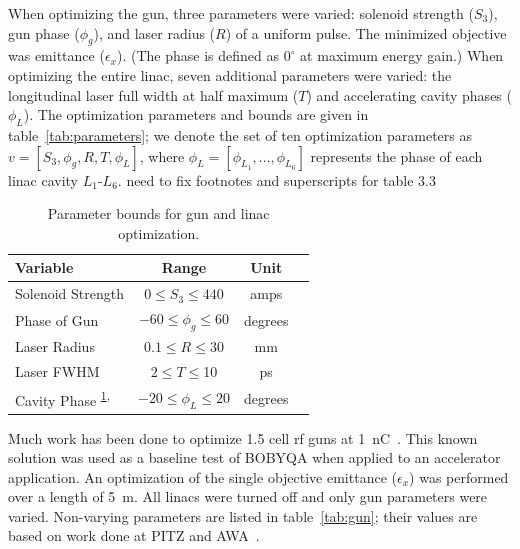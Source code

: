 \documentclass{iitthesis}
\newcommand{\nrnote}[1]{\textsf{{\color{blue}{ NN note:}   #1 }}}
\begin{document}
When optimizing the gun, three parameters were varied: 
solenoid strength ($S_3$), gun phase ($\phi_g$), 
and laser radius ($R$) of a uniform pulse. 
The minimized objective was emittance ($\epsilon_x$).
(The phase is defined as $0^{\circ}$ at maximum energy gain.) 
When optimizing the entire linac, seven additional parameters were 
varied: the longitudinal laser full width at half maximum ($T$)
and accelerating cavity phases ($\phi_L$). The optimization parameters and
bounds are given in table~\ref{tab:parameters}; we denote the set of
ten optimization parameters as $v=[S_3, \phi_g, R, T, \phi_L]$, where 
$\phi_L=[\phi_{L_1},\ldots,\phi_{L_6}]$ represents the phase of each linac cavity $L_1$-$L_6$. 
\nrnote{need to fix footnotes and superscripts for table 3.3}
\begin{table}
	\caption{\label{tab:parameters} Parameter bounds for gun and linac optimization.}
	\begin{center}
		\begin{tabular}{ l *{3}{c}} 
			\toprule
			\textbf{Variable} & \textbf{Range} & \textbf{Unit} \\
			\midrule
			Solenoid Strength & $ 0 \le S_3 \le 440$  & amps \\
			Phase of Gun & $-60 \le \phi_g \le 60$  & degrees \\
			Laser Radius  & $0.1 \le R \le 30$  & mm \\
			Laser FWHM \footnotemark \label{note1}& $2 \le T \le $10  & ps \\
			Cavity Phase \textsuperscript{\ref{note1},}\footnotemark & $-20 \le \phi_L \le 20$  & degrees \\
			\bottomrule	
		\end{tabular}
	\addtocounter{footnote}{-1}
	\addtocounter{footnote}{+1}
	\end{center}
\end{table}


 \label{sec:gunbobyqa}
Much work has been done to optimize 1.5 cell rf guns
at \SI{1}{nC}~\cite{pitz}. This known solution was used as 
a baseline test of BOBYQA when applied to an accelerator application.
An optimization of the single objective emittance ($\epsilon_x$) was 
performed over a length of \SI{5}{m}. 
All linacs were turned off and only gun parameters were varied. 
Non-varying parameters are listed in table~\ref{tab:gun}; 
their values are based on work done at PITZ and AWA~\cite{pitz, benchmark}.
\end{document}
